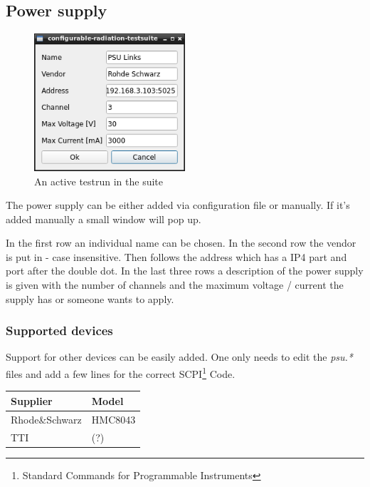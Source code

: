 \documentclass[10pt,a4paper]{article}
\begin{document}
	\subsection{Power supply}
	
	\begin{figure}[H]
	\centering
	\includegraphics[width=0.5\textwidth]{./2_PSU_menu.png}
	\caption{An active testrun in the suite}
	\end{figure}
	
	The power supply can be either added via configuration file or manually. If it's added manually a small window will pop up. 
	
	In the first row an individual name can be chosen. In the second row the vendor is put in - case insensitive. Then follows the address which has a IP4 part and port after the double dot. In the last three rows a description of the power supply is given with the number of channels and the maximum voltage / current the supply has or someone wants to apply.	
	
		\subsubsection{Supported devices}
		Support for other devices can be easily added. One only needs to edit the \textit{psu.*} files and add a few lines for the correct SCPI\footnote{Standard Commands for Programmable Instruments} Code.
	
		\begin{table}[H]
		\centering
		\begin{tabular}{ll}
		\toprule
		Supplier			& Model \\ \midrule
		Rhode\&Schwarz		& HMC8043 \\
		TTI					& (?) \\
		\bottomrule
		\end{tabular}			
		\end{table}	
	
\end{document}
